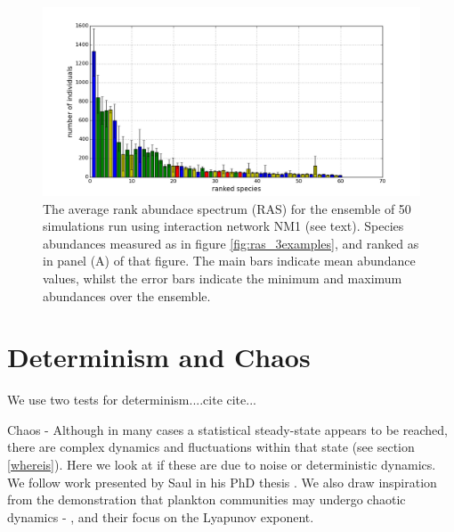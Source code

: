 \begin{figure}[h!]
	\centering
	\includegraphics[width=1.0\linewidth]{"./chapters/chapter04b/figures/ras_dist"}
    \caption{The average rank abundace spectrum (RAS) for the ensemble of 50 simulations run using interaction network NM1 (see text). Species abundances measured as in figure \ref{fig:ras_3examples}, and ranked as in panel (A) of that figure. The main bars indicate mean abundance values, whilst the error bars indicate the minimum and maximum abundances over the ensemble.}    
    \label{fig:ras_dist}
\end{figure}


\section{Determinism and Chaos}
\label{sec:determinism}

We use two tests for determinism....cite cite...

Chaos - Although in many cases a statistical steady-state appears to be reached, there are complex dynamics and fluctuations within that state (see section \ref{whereis}).  Here we look at if these are due to noise or deterministic dynamics. We follow work presented by Saul in his PhD thesis \cite{saul09phd}. We also draw inspiration from the demonstration that plankton communities may undergo chaotic dynamics - \cite{beninca2008chaos}, and their focus on the Lyapunov exponent.



